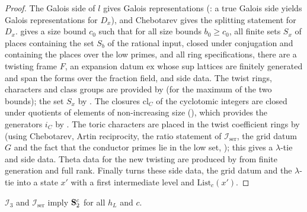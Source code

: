 \begin{proof}
The Galois side of $l$ gives Galois representations
(: a true Galois side yields Galois
representations for $D_x$), and Chebotarev gives the splitting statement
for $D_x$.  gives a size bound $c_0$ such that for all size bounds $b_0\ge c_0$, all
finite sets $S_x$ of places containing the set $S_b$ of the rational input, closed under conjugation and
containing the places over the low primes, and all ring specifications, there are a twisting frame $F$, an
expansion datum $\mathrm{ex}$ whose sup lattices are finitely generated and span the forms over the fraction
field, and side data. The twist rings, characters and class groups
are provided by  (for the maximum of the two
bounds); the set $S_x$ by . The closures
$\mathrm{cl}_C$ of the cyclotomic integers are closed under quotients of elements of non-increasing size
(), which provides the generators $i_C$ by
. The toric characters are placed in the twist coefficient
rings by  (using Chebotarev, Artin
reciprocity, the ratio statement of $\mathcal{I}_{\mathrm{ser}}$, the grid datum $G$ and the fact that the conductor
primes lie in the low set, ); this gives a $\lambda$-tie and
side data. Theta data for the new twisting are produced by
 from finite generation and full rank. Finally
 turns these side data, the grid datum and the
$\lambda$-tie into a state $x'$ with a first intermediate level and $\mathrm{List}_c(x')$.
\end{proof}

\begin{proposition}\label{pf:baselat2:series}
$\mathcal{I}_3$ and $\mathcal{I}_{\mathrm{ser}}$ imply $\mathbf{S}_{\mathrm{2}}^{c}$ for all $h_L$ and $c$.
\end{proposition}

